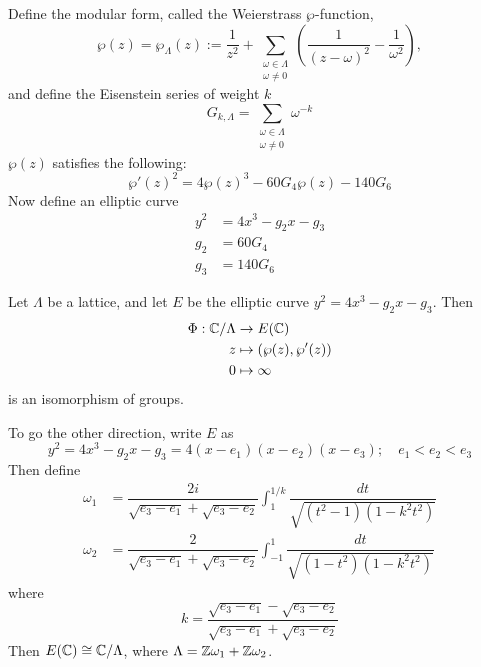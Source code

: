 \begin{frame}[plain]
\phantom{x} \par
Define the modular form, called the Weierstrass $\wp$-function,
	\[
	\wp(z)= \wp_\Lambda(z):= \dfrac{1}{z^2} + \sum_{\substack{\omega \in \Lambda \\ \omega \neq 0}} \left( \dfrac{1}{(z - \omega)^2} - \dfrac{1}{\omega^2} \right),
	\]
and define the Eisenstein series of weight $k$
	\[
	G_{k,\Lambda}= \sum_{\substack{\omega \in \Lambda \\ \omega \neq 0}} \omega^{-k}
	\]
$\wp(z)$ satisfies the following:
	\[
	\wp'(z)^2= 4\wp(z)^3 - 60G_4\wp(z) - 140 G_6
	\]
Now define an elliptic curve	
	\[
	\begin{aligned}
	y^2&= 4x^3 - g_2 x - g_3 \\
	g_2&= 60 G_4 \\
	g_3&= 140 G_6
	\end{aligned}
	\]
\end{frame}




\begin{frame}[plain]

\begin{thm}
Let $\Lambda$ be a lattice, and let $E$ be the elliptic curve $y^2= 4x^3 - g_2x - g_3$. Then
	\[
	\begin{aligned}
	\Phi: \mathbb{C}/\Lambda &\to E(\mathbb{C}) \\
	z &\mapsto (\wp(z),\wp'(z)) \\
	0 &\mapsto \infty
	\end{aligned}
	\]
is an isomorphism of groups.
\end{thm}
\end{frame}





\begin{frame}[plain]
To go the other direction, write $E$ as 
	\[
	y^2= 4x^3 - g_2 x - g_3 = 4(x - e_1)(x - e_2)(x - e_3); \quad e_1<e_2<e_3
	\]
Then define
	\[
	\begin{aligned}
	\omega_1&= \dfrac{2i}{\sqrt{e_3-e_1} + \sqrt{e_3-e_2}} \int_1^{1/k} \dfrac{dt}{\sqrt{(t^2-1)(1-k^2t^2)}} \\
	\omega_2&= \dfrac{2}{\sqrt{e_3-e_1} + \sqrt{e_3-e_2}} \int_{-1}^1 \dfrac{dt}{\sqrt{(1-t^2)(1-k^2t^2)}}
	\end{aligned}
	\]
where
	\[
	k= \dfrac{\sqrt{e_3-e_1} - \sqrt{e_3-e_2}}{\sqrt{e_3-e_1} + \sqrt{e_3-e_2}}
	\] \pspace
Then $E(\mathbb{C}) \cong \mathbb{C}/\Lambda$, where $\Lambda= \mathbb{Z} \omega_1 + \mathbb{Z}\omega_2$.
\end{frame}



